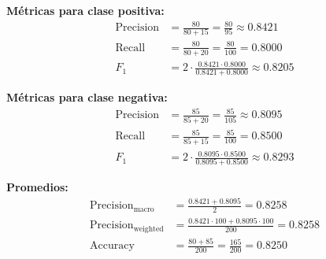 \documentclass[12pt]{article}
\begin{document}
\textbf{Métricas para clase positiva:}
\begin{align}
\text{Precision} &= \frac{80}{80 + 15} = \frac{80}{95} \approx 0.8421 \\
\text{Recall} &= \frac{80}{80 + 20} = \frac{80}{100} = 0.8000 \\
F_1 &= 2 \cdot \frac{0.8421 \cdot 0.8000}{0.8421 + 0.8000} \approx 0.8205
\end{align}

\textbf{Métricas para clase negativa:}
\begin{align}
\text{Precision} &= \frac{85}{85 + 20} = \frac{85}{105} \approx 0.8095 \\
\text{Recall} &= \frac{85}{85 + 15} = \frac{85}{100} = 0.8500 \\
F_1 &= 2 \cdot \frac{0.8095 \cdot 0.8500}{0.8095 + 0.8500} \approx 0.8293
\end{align}

\textbf{Promedios:}
\begin{align}
\text{Precision}_{\text{macro}} &= \frac{0.8421 + 0.8095}{2} = 0.8258 \\
\text{Precision}_{\text{weighted}} &= \frac{0.8421 \cdot 100 + 0.8095 \cdot 100}{200} = 0.8258 \\
\text{Accuracy} &= \frac{80 + 85}{200} = \frac{165}{200} = 0.8250
\end{align}
\end{document}
